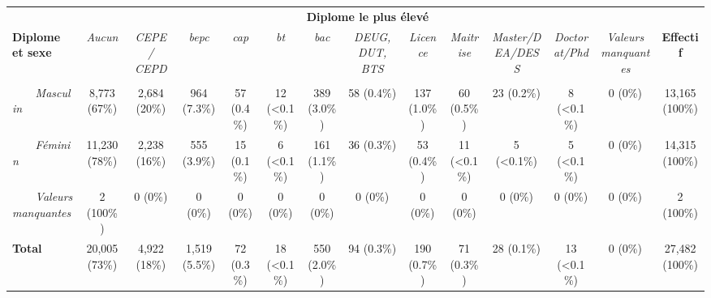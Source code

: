 \documentclass[
]{article}
\begin{document}
\begin{table}[!t]
\fontsize{12.0pt}{14.4pt}\selectfont
\begin{tabular*}{\linewidth}{@{\extracolsep{\fill}}lccccccccccccc}
\toprule
 & \multicolumn{12}{c}{\textbf{Diplome le plus élevé}} &  \\ 
\cmidrule(lr){2-13}
\textbf{Diplome et sexe} & \emph{Aucun} & \emph{CEPE / CEPD} & \emph{bepc} & \emph{cap} & \emph{bt} & \emph{bac} & \emph{DEUG, DUT, BTS} & \emph{Licence} & \emph{Maitrise} & \emph{Master/DEA/DESS} & \emph{Doctorat/Phd} & \emph{Valeurs manquantes} & \textbf{Effectif} \\ 
\midrule\addlinespace[2.5pt]
{\bfseries Sexe} &  &  &  &  &  &  &  &  &  &  &  &  &  \\ 
{\itshape     Masculin} & 8,773 (67\%) & 2,684 (20\%) & 964 (7.3\%) & 57 (0.4\%) & 12 (<0.1\%) & 389 (3.0\%) & 58 (0.4\%) & 137 (1.0\%) & 60 (0.5\%) & 23 (0.2\%) & 8 (<0.1\%) & 0 (0\%) & 13,165 (100\%) \\ 
{\itshape     Féminin} & 11,230 (78\%) & 2,238 (16\%) & 555 (3.9\%) & 15 (0.1\%) & 6 (<0.1\%) & 161 (1.1\%) & 36 (0.3\%) & 53 (0.4\%) & 11 (<0.1\%) & 5 (<0.1\%) & 5 (<0.1\%) & 0 (0\%) & 14,315 (100\%) \\ 
{\itshape     Valeurs manquantes} & 2 (100\%) & 0 (0\%) & 0 (0\%) & 0 (0\%) & 0 (0\%) & 0 (0\%) & 0 (0\%) & 0 (0\%) & 0 (0\%) & 0 (0\%) & 0 (0\%) & 0 (0\%) & 2 (100\%) \\ 
{\bfseries Total} & 20,005 (73\%) & 4,922 (18\%) & 1,519 (5.5\%) & 72 (0.3\%) & 18 (<0.1\%) & 550 (2.0\%) & 94 (0.3\%) & 190 (0.7\%) & 71 (0.3\%) & 28 (0.1\%) & 13 (<0.1\%) & 0 (0\%) & 27,482 (100\%) \\ 
\bottomrule
\end{tabular*}
\end{table}
\end{document}
